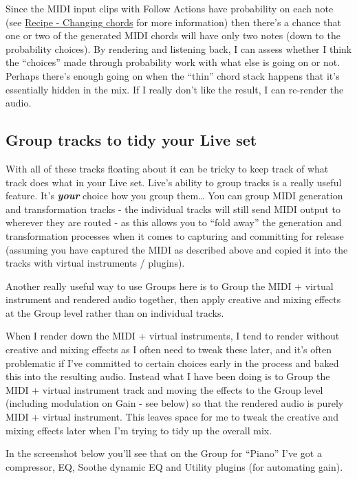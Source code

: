 \documentclass[
  12pt,
  letterpaper,
  oneside,
  open=any]{scrbook}
\begin{document}
Since the MIDI input clips with Follow Actions have probability on each
note (see \hyperref[Chapter-001-Recipe-Changing_Chords]{Recipe -
Changing chords} for more information) then there's a chance that one or
two of the generated MIDI chords will have only two notes (down to the
probability choices). By rendering and listening back, I can assess
whether I think the ``choices'' made through probability work with what
else is going on or not. Perhaps there's enough going on when the
``thin'' chord stack happens that it's essentially hidden in the mix. If
I really don't like the result, I can re-render the audio.

\subsection{Group tracks to tidy your Live
set}\label{group-tracks-to-tidy-your-live-set}

With all of these tracks floating about it can be tricky to keep track
of what track does what in your Live set. Live's ability to group tracks
is a really useful feature. It's \textbf{\emph{your}} choice how you
group them\ldots{} You can group MIDI generation and transformation
tracks - the individual tracks will still send MIDI output to wherever
they are routed - as this allows you to ``fold away'' the generation and
transformation processes when it comes to capturing and committing for
release (assuming you have captured the MIDI as described above and
copied it into the tracks with virtual instruments / plugins).

Another really useful way to use Groups here is to Group the MIDI +
virtual instrument and rendered audio together, then apply creative and
mixing effects at the Group level rather than on individual tracks.

When I render down the MIDI + virtual instruments, I tend to render
without creative and mixing effects as I often need to tweak these
later, and it's often problematic if I've committed to certain choices
early in the process and baked this into the resulting audio. Instead
what I have been doing is to Group the MIDI + virtual instrument track
and moving the effects to the Group level (including modulation on Gain
- see below) so that the rendered audio is purely MIDI + virtual
instrument. This leaves space for me to tweak the creative and mixing
effects later when I'm trying to tidy up the overall mix.

In the screenshot below you'll see that on the Group for ``Piano'' I've
got a compressor, EQ, Soothe dynamic EQ and Utility plugins (for
automating gain).
\end{document}
